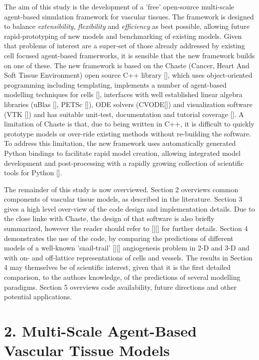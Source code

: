 \documentclass[superscriptaddress, a4paper]{article}
\begin{document}
The aim of this study is the development of a 'free' open-source multi-scale agent-based simulation framework for vascular tissues. The framework is designed to balance \emph{extensibility}, \emph{flexibility} and \emph{efficiency} as best possible, allowing future rapid-prototyping of new models and benchmarking of existing models. Given that problems of interest are a super-set of those already addressed by existing cell focused agent-based framerworks, it is sensible that the new framework builds on one of these. The new framework is based on the Chaste (Cancer, Heart And Soft Tissue Environment) open source C++ library [], which uses object-oriented programming including templating, implements a number of agent-based modelling techniques for cells [], interfaces with well established linear algebra libraries (uBlas [], PETSc []), ODE solvers (CVODE[]) and visualization software (VTK []) and has suitable unit-test, documentation and tutorial coverage []. A limitation of Chaste is that, due to being written in C++, it is difficult to quickly prototype models or over-ride existing methods without re-building the software. To address this limitation, the new framework uses automatically generated Python bindings to facilitate rapid model creation, allowing integrated model development and post-processing with a rapidly growing collection of scientific tools for Python [].

The remainder of this study is now overviewed. Section 2 overviews common components of vascular tissue models, as described in the literature. Section 3 gives a high level over-view of the code design and implementation details. Due to the close linke with Chaste, the design of that software is also briefly summarized, however the reader should refer to [][] for further details. Section 4 demonstrates the use of the code, by comparing the predictions of different models of a well-known 'snail-trail' [][] angiogenesis problem in 2-D and 3-D and with on- and off-lattice representations of cells and vessels. The results in Section 4 may themselves be of scientific interest, given that it is the first detailed comparison, to the authors knowledge, of the predictions of several modelling paradigms. Section 5 overviews code availability, future directions and other potential applications.

\section{2. Multi-Scale Agent-Based Vascular Tissue Models}
\label{sec:modelling_overview}
\end{document}
